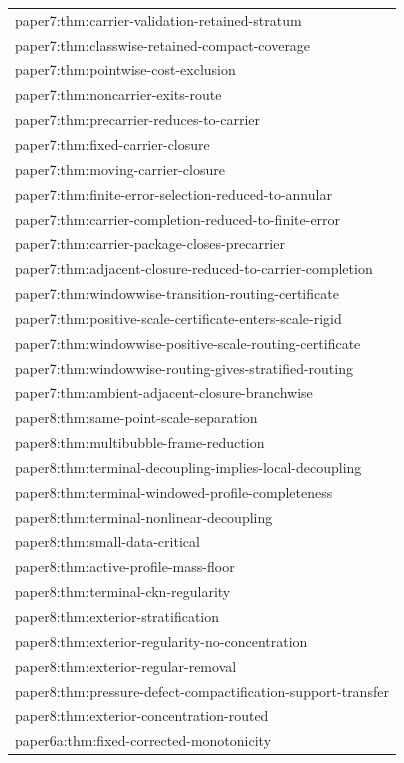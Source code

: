 \documentclass[11pt]{amsart}
\begin{document}
\begin{longtable}{@{}>{\ttfamily\footnotesize\raggedright\arraybackslash}p{}@{}}
paper7:thm:carrier-validation-retained-stratum\\
paper7:thm:classwise-retained-compact-coverage\\
paper7:thm:pointwise-cost-exclusion\\
paper7:thm:noncarrier-exits-route\\
paper7:thm:precarrier-reduces-to-carrier\\
paper7:thm:fixed-carrier-closure\\
paper7:thm:moving-carrier-closure\\
paper7:thm:finite-error-selection-reduced-to-annular\\
paper7:thm:carrier-completion-reduced-to-finite-error\\
paper7:thm:carrier-package-closes-precarrier\\
paper7:thm:adjacent-closure-reduced-to-carrier-completion\\
paper7:thm:windowwise-transition-routing-certificate\\
paper7:thm:positive-scale-certificate-enters-scale-rigid\\
paper7:thm:windowwise-positive-scale-routing-certificate\\
paper7:thm:windowwise-routing-gives-stratified-routing\\
paper7:thm:ambient-adjacent-closure-branchwise\\
paper8:thm:same-point-scale-separation\\
paper8:thm:multibubble-frame-reduction\\
paper8:thm:terminal-decoupling-implies-local-decoupling\\
paper8:thm:terminal-windowed-profile-completeness\\
paper8:thm:terminal-nonlinear-decoupling\\
paper8:thm:small-data-critical\\
paper8:thm:active-profile-mass-floor\\
paper8:thm:terminal-ckn-regularity\\
paper8:thm:exterior-stratification\\
paper8:thm:exterior-regularity-no-concentration\\
paper8:thm:exterior-regular-removal\\
paper8:thm:pressure-defect-compactification-support-transfer\\
paper8:thm:exterior-concentration-routed\\
paper6a:thm:fixed-corrected-monotonicity\\

\end{longtable}
\end{document}
